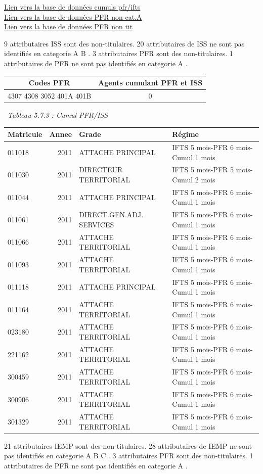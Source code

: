 \href{../Bases/Reglementation/personnels.pfr.ifts.csv}{Lien vers la base de
données cumuls pfr/ifts}\\
\href{../Bases/Reglementation/PFR.non.catA.csv}{Lien vers la base de
données PFR non cat.A}\\
\href{../Bases/Reglementation/PFR.non.tit.csv}{Lien vers la base de données
PFR non tit}

9 attributaires ISS sont des non-titulaires. 20 attributaires de ISS ne
sont pas identifiés en categorie A B . 3 attributaires PFR sont des
non-titulaires. 1 attributaires de PFR ne sont pas identifiés en
categorie A .

\begin{longtable}[]{@{}cc@{}}
\toprule
Codes PFR & Agents cumulant PFR et ISS\tabularnewline
\midrule
\endhead
4307 4308 3052 401A 401B & 0\tabularnewline
\bottomrule
\end{longtable}

~\emph{Tableau 5.7.3 : Cumul PFR/ISS}

\begin{longtable}[]{@{}lrll@{}}
\toprule
Matricule & Annee & Grade & Régime\tabularnewline
\midrule
\endhead
011018 & 2011 & ATTACHE PRINCIPAL & IFTS 5 mois-PFR 6 mois-Cumul 1
mois\tabularnewline
011030 & 2011 & DIRECTEUR TERRITORIAL & IFTS 5 mois-PFR 5 mois-Cumul 2
mois\tabularnewline
011044 & 2011 & ATTACHE PRINCIPAL & IFTS 5 mois-PFR 6 mois-Cumul 1
mois\tabularnewline
011061 & 2011 & DIRECT.GEN.ADJ. SERVICES & IFTS 5 mois-PFR 6 mois-Cumul
1 mois\tabularnewline
011066 & 2011 & ATTACHE TERRITORIAL & IFTS 5 mois-PFR 6 mois-Cumul 1
mois\tabularnewline
011093 & 2011 & ATTACHE TERRITORIAL & IFTS 5 mois-PFR 6 mois-Cumul 1
mois\tabularnewline
011118 & 2011 & ATTACHE PRINCIPAL & IFTS 5 mois-PFR 6 mois-Cumul 1
mois\tabularnewline
011164 & 2011 & ATTACHE TERRITORIAL & IFTS 5 mois-PFR 6 mois-Cumul 1
mois\tabularnewline
023180 & 2011 & ATTACHE TERRITORIAL & IFTS 5 mois-PFR 6 mois-Cumul 1
mois\tabularnewline
221162 & 2011 & ATTACHE TERRITORIAL & IFTS 5 mois-PFR 6 mois-Cumul 1
mois\tabularnewline
300459 & 2011 & ATTACHE TERRITORIAL & IFTS 5 mois-PFR 6 mois-Cumul 1
mois\tabularnewline
300906 & 2011 & ATTACHE TERRITORIAL & IFTS 5 mois-PFR 6 mois-Cumul 1
mois\tabularnewline
301329 & 2011 & ATTACHE TERRITORIAL & IFTS 5 mois-PFR 6 mois-Cumul 1
mois\tabularnewline
\bottomrule
\end{longtable}

21 attributaires IEMP sont des non-titulaires. 28 attributaires de IEMP
ne sont pas identifiés en categorie A B C . 3 attributaires PFR sont des
non-titulaires. 1 attributaires de PFR ne sont pas identifiés en
categorie A .

